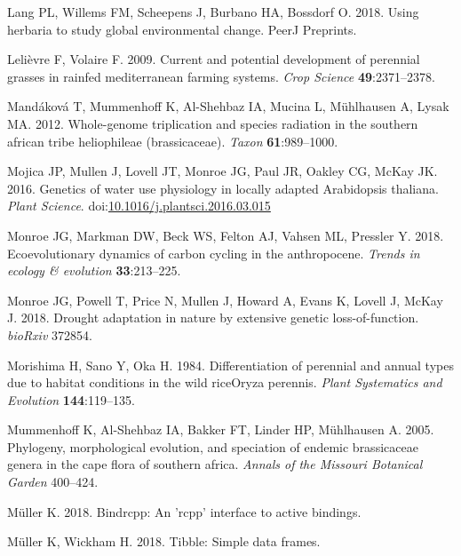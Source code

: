 \documentclass[man,floatsintext]{apa6}
\theoremstyle{definition}
\theoremstyle{definition}
\theoremstyle{definition}
\theoremstyle{remark}
\begin{document}
\leavevmode\hypertarget{ref-lang2018using}{}%
Lang PL, Willems FM, Scheepens J, Burbano HA, Bossdorf O. 2018. Using
herbaria to study global environmental change. PeerJ Preprints.

\leavevmode\hypertarget{ref-lelievre2009current}{}%
Lelièvre F, Volaire F. 2009. Current and potential development of
perennial grasses in rainfed mediterranean farming systems. \emph{Crop
Science} \textbf{49}:2371--2378.

\leavevmode\hypertarget{ref-mandakova2012whole}{}%
Mandáková T, Mummenhoff K, Al-Shehbaz IA, Mucina L, Mühlhausen A, Lysak
MA. 2012. Whole-genome triplication and species radiation in the
southern african tribe heliophileae (brassicaceae). \emph{Taxon}
\textbf{61}:989--1000.

\leavevmode\hypertarget{ref-Mojica2016}{}%
Mojica JP, Mullen J, Lovell JT, Monroe JG, Paul JR, Oakley CG, McKay JK.
2016. Genetics of water use physiology in locally adapted Arabidopsis
thaliana. \emph{Plant Science}.
doi:\href{https://doi.org/10.1016/j.plantsci.2016.03.015}{10.1016/j.plantsci.2016.03.015}

\leavevmode\hypertarget{ref-monroe2018ecoevolutionary}{}%
Monroe JG, Markman DW, Beck WS, Felton AJ, Vahsen ML, Pressler Y. 2018.
Ecoevolutionary dynamics of carbon cycling in the anthropocene.
\emph{Trends in ecology \& evolution} \textbf{33}:213--225.

\leavevmode\hypertarget{ref-monroe2018drought}{}%
Monroe JG, Powell T, Price N, Mullen J, Howard A, Evans K, Lovell J,
McKay J. 2018. Drought adaptation in nature by extensive genetic
loss-of-function. \emph{bioRxiv} 372854.

\leavevmode\hypertarget{ref-morishima1984differentiation}{}%
Morishima H, Sano Y, Oka H. 1984. Differentiation of perennial and
annual types due to habitat conditions in the wild riceOryza perennis.
\emph{Plant Systematics and Evolution} \textbf{144}:119--135.

\leavevmode\hypertarget{ref-mummenhoff2005phylogeny}{}%
Mummenhoff K, Al-Shehbaz IA, Bakker FT, Linder HP, Mühlhausen A. 2005.
Phylogeny, morphological evolution, and speciation of endemic
brassicaceae genera in the cape flora of southern africa. \emph{Annals
of the Missouri Botanical Garden} 400--424.

\leavevmode\hypertarget{ref-R-bindrcpp}{}%
Müller K. 2018. Bindrcpp: An 'rcpp' interface to active bindings.

\leavevmode\hypertarget{ref-R-tibble}{}%
Müller K, Wickham H. 2018. Tibble: Simple data frames.
\end{document}
